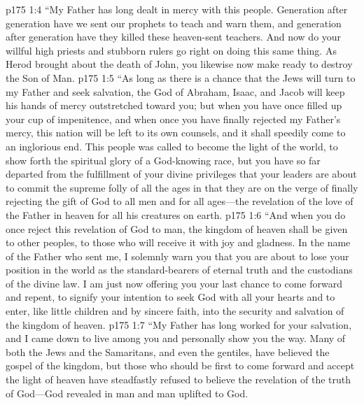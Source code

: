 \vs p175 1:4 \textcolor{ubdarkred}{“My Father has long dealt in mercy with this people. Generation after generation have we sent our prophets to teach and warn them, and generation after generation have they killed these heaven\hyp{}sent teachers. And now do your willful high priests and stubborn rulers go right on doing this same thing. As Herod brought about the death of John, you likewise now make ready to destroy the Son of Man.}
\vs p175 1:5 \textcolor{ubdarkred}{“As long as there is a chance that the Jews will turn to my Father and seek salvation, the God of Abraham, Isaac, and Jacob will keep his hands of mercy outstretched toward you; but when you have once filled up your cup of impenitence, and when once you have finally rejected my Father’s mercy, this nation will be left to its own counsels, and it shall speedily come to an inglorious end. This people was called to become the light of the world, to show forth the spiritual glory of a God\hyp{}knowing race, but you have so far departed from the fulfillment of your divine privileges that your leaders are about to commit the supreme folly of all the ages in that they are on the verge of finally rejecting the gift of God to all men and for all ages---the revelation of the love of the Father in heaven for all his creatures on earth.}
\vs p175 1:6 \textcolor{ubdarkred}{“And when you do once reject this revelation of God to man, the kingdom of heaven shall be given to other peoples, to those who will receive it with joy and gladness. In the name of the Father who sent me, I solemnly warn you that you are about to lose your position in the world as the standard\hyp{}bearers of eternal truth and the custodians of the divine law. I am just now offering you your last chance to come forward and repent, to signify your intention to seek God with all your hearts and to enter, like little children and by sincere faith, into the security and salvation of the kingdom of heaven.}
\vs p175 1:7 \textcolor{ubdarkred}{“My Father has long worked for your salvation, and I came down to live among you and personally show you the way. Many of both the Jews and the Samaritans, and even the gentiles, have believed the gospel of the kingdom, but those who should be first to come forward and accept the light of heaven have steadfastly refused to believe the revelation of the truth of God---God revealed in man and man uplifted to God.}
